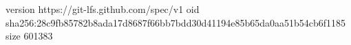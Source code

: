version https://git-lfs.github.com/spec/v1
oid sha256:28c9fb85782b8ada17d8687f66bb7bdd30d41194e85b65da0aa51b54cb6f1185
size 601383
